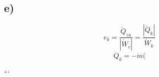 

\subsection*{e)}
\begin{equation*}
    e_k = \frac{\dot{Q}_{zu}}{\left| \dot{W}_c \right|} = \frac{\left| \dot{Q}_k \right|}{\dot{W}_k}
\end{equation*}
\begin{equation*}
    \dot{Q}_k = - \dot{m} (
\end{equation*}

```